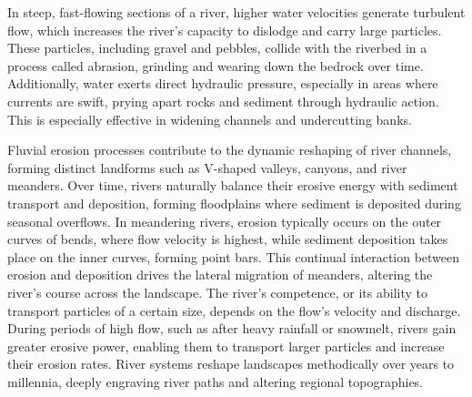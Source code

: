 In steep, fast-flowing sections of a river, higher water velocities generate turbulent flow, which increases the river's capacity to dislodge and carry large particles. These particles, including gravel and pebbles, collide with the riverbed in a process called abrasion, grinding and wearing down the bedrock over time. Additionally, water exerts direct hydraulic pressure, especially in areas where currents are swift, prying apart rocks and sediment through hydraulic action. This is especially effective in widening channels and undercutting banks.

Fluvial erosion processes contribute to the dynamic reshaping of river channels, forming distinct landforms such as V-shaped valleys, canyons, and river meanders. Over time, rivers naturally balance their erosive energy with sediment transport and deposition, forming floodplains where sediment is deposited during seasonal overflows. In meandering rivers, erosion typically occurs on the outer curves of bends, where flow velocity is highest, while sediment deposition takes place on the inner curves, forming point bars. This continual interaction between erosion and deposition drives the lateral migration of meanders, altering the river's course across the landscape. The river's competence, or its ability to transport particles of a certain size, depends on the flow's velocity and discharge. During periods of high flow, such as after heavy rainfall or snowmelt, rivers gain greater erosive power, enabling them to transport larger particles and increase their erosion rates. River systems reshape landscapes methodically over years to millennia, deeply engraving river paths and altering regional topographies.




